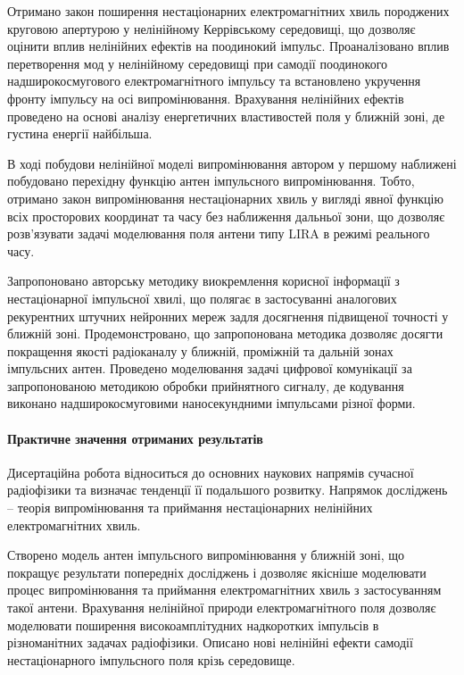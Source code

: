 Отримано закон поширення нестаціонарних електромагнітних 
хвиль породжених круговою апертурою у нелінійному Керрівському 
середовищі, що дозволяє оцінити вплив нелінійних ефектів на поодинокий 
імпульс. Проаналізовано вплив перетворення мод у нелінійному середовищі 
при самодії поодинокого надширокосмугового електромагнітного імпульсу та 
встановлено укручення фронту імпульсу на осі випромінювання. 
Врахування нелінійних ефектів проведено на основі аналізу енергетичних 
властивостей поля у ближній зоні, де густина енергії найбільша.

В ході побудови нелінійної моделі випромінювання автором у першому 
наближені побудовано перехідну функцію антен імпульсного випромінювання. 
Тобто, отримано закон випромінювання нестаціонарних хвиль у вигляді 
явної функцію всіх просторових координат та часу без наближення 
дальньої зони, що дозволяє розв’язувати задачі моделювання поля антени 
типу LIRA в режимі реального часу.

Запропоновано авторську методику виокремлення корисної інформації з 
нестаціонарної імпульсної хвилі, що полягає в застосуванні аналогових 
рекурентних штучних нейронних мереж задля досягнення підвищеної точності 
у ближній зоні. Продемонстровано, що запропонована методика дозволяє 
досягти покращення якості радіоканалу у ближній, проміжній та дальній 
зонах імпульсних антен. Проведено моделювання задачі цифрової 
комунікації за запропонованою методикою обробки прийнятного 
сигналу, де кодування виконано надширокосмуговими наносекундними 
імпульсами різної форми.

\paragraph{Практичне значення отриманих результатів}

Дисертаційна робота відноситься до основних наукових напрямів сучасної 
радіофізики та визначає тенденції її подальшого розвитку. Напрямок
досліджень -- теорія випромінювання та приймання нестаціонарних 
нелінійних електромагнітних хвиль.

Створено модель антен імпульсного випромінювання у ближній зоні, що 
покращує результати попередніх досліджень і дозволяє якісніше моделювати 
процес випромінювання та приймання електромагнітних хвиль з застосуванням 
такої антени. Врахування нелінійної природи електромагнітного поля дозволяє
моделювати поширення високоамплітудних надкоротких імпульсів в різноманітних
задачах радіофізики. Описано нові нелінійні ефекти самодії нестаціонарного 
імпульсного поля крізь середовище.

